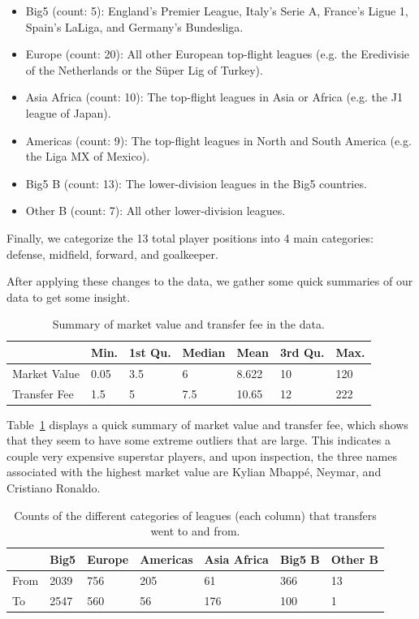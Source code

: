 \begin{itemize}
    \item Big5 (count: 5):
        England's Premier League, 
        Italy's Serie A, 
        France's Ligue 1, 
        Spain's LaLiga, 
        and Germany's Bundesliga.
    \item Europe (count: 20): 
        All other European top-flight leagues 
        (e.g. the Eredivisie of the Netherlands or 
        the S\"{u}per Lig of Turkey).
    \item Asia Africa (count: 10): 
        The top-flight leagues in Asia or Africa
        (e.g. the J1 league of Japan).
    \item Americas (count: 9): 
        The top-flight leagues in North and South America
        (e.g. the Liga MX of Mexico).
    \item Big5 B (count: 13): 
        The lower-division leagues in the Big5 countries.
    \item Other B (count: 7): All other lower-division leagues.
\end{itemize}

Finally, we categorize the 13 total player positions into 4 main categories: 
defense, midfield, forward, and goalkeeper. 

After applying these changes to the data,
we gather some quick summaries of our data to get some insight.

\begin{table}[H]
    \centering 
    \begin{tabular}{|l|llllll|} 
    \hline 
       & Min. & 1st Qu. & Median  &  Mean& 3rd Qu. &Max. \\  \hline 
       Market Value & 0.05 &  3.5 &  6 &  8.622 & 10 & 120 \\ 
       Transfer Fee &   1.5 &   5 &   7.5 &  10.65 &  12  &222  \\ \hline 
    \end{tabular}
    \caption{Summary of market value and transfer fee in the data.}
    \label{tab:transfer-quick-summary}
\end{table}

Table~\ref{tab:transfer-quick-summary} displays a quick summary of 
market value and transfer fee, which
shows that they seem to have some extreme outliers 
that are large.
This indicates a couple very expensive superstar players,
and upon inspection, the three names associated with the highest market value are
Kylian Mbapp\'e, Neymar, and Cristiano Ronaldo.

\begin{table}[H]
    \centering
    \begin{tabular}{|l|llllll|} 
    \hline 
          & Big5    &  Europe &   Americas & Asia Africa & Big5 B  &  Other B \\ \hline 
        From &   2039  &756 &205 & 61   &366 &   13 \\
        To &  2547 &   560 &  56  & 176 &   100 & 1 \\ \hline 
    \end{tabular}
    \caption{Counts of the different categories of leagues (each column) that transfers went to and from.}
    \label{tab:transfer-counts-leagues}
\end{table}

